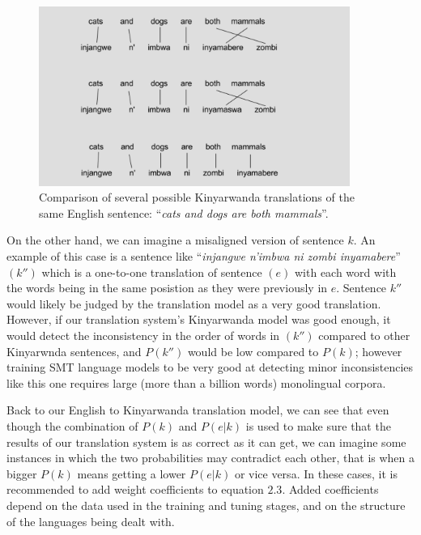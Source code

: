 \begin{figure}[h]
\begin{center}
\includegraphics[width=4in]{figures/cats.png}
\caption{Comparison of several possible Kinyarwanda translations of the same English sentence: ``\textit{cats and dogs are both mammals}''.}
\end{center}
\end{figure}
On the other hand, we can imagine a misaligned version of sentence $k$. An example of this case is a sentence like ``\textit{injangwe n'imbwa ni zombi inyamabere}''$(k'')$ which is a one-to-one translation of sentence $(e)$ with each word with the words being in the same posistion as they were previously in $e$. Sentence $k''$ would likely be judged by the translation model as a very good translation. However, if our translation system's Kinyarwanda model was good enough, it would detect the inconsistency in the order of words in $(k'')$ compared to other Kinyarwnda sentences, and $P(k'')$ would be low compared to $P(k)$; however training SMT language models to be very good at detecting minor inconsistencies like this one requires large (more than a billion words) monolingual corpora\cite{och2005statistical}. %

Back to our English to Kinyarwanda translation model, we can see that even though the combination of $P(k)$ and $P(e|k)$ is used to make sure that the results of our translation system is as correct as it can get, we can imagine some instances in which the two probabilities may contradict each other, that is when a bigger $P(k)$ means getting a lower $P(e|k)$ or vice versa. In these cases, it is recommended to add weight coefficients to equation $2.3$. Added coefficients depend on the data used in the training and tuning stages, and on the structure of the languages being dealt with.
